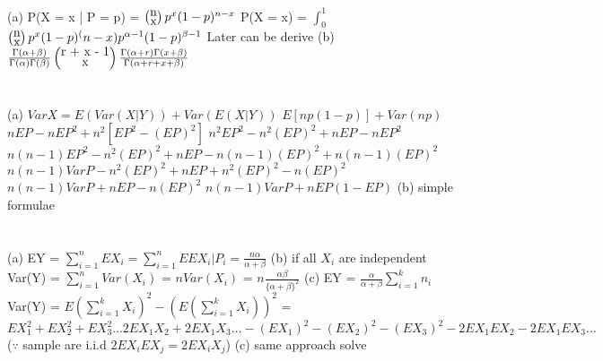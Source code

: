 \documentclass{report}
\begin{document}
\section{}
(a) P(X = x | P = p) = $\left(\stackanchor{n}{x}\right)p^x(1 - p)^{n-x}$
\newline
P(X = x) = $\int_{0}^{1}$$\left(\stackanchor{n}{x}\right)p^x(1-p)^(n-x)p^{\alpha - 1}(1 - p)^{\beta - 1}$
\newline
Later can be derive
\newline
(b) $\frac{\Gamma(\alpha + \beta)}{\Gamma(\alpha)\Gamma(\beta)}\left(\stackanchor{r + x - 1}{x}\right)\frac{\Gamma(\alpha + r)\Gamma(x + \beta)}{\Gamma(\alpha + r + x + \beta)}$
\newline
\section{}
(a) $VarX = E(Var(X|Y)) + Var(E(X|Y))$
\newline
$E[np(1 - p)] + Var(np)$
\newline
$nEP - nEP^2 + n^2[EP^2 - (EP)^2]$
\newline
$n^2EP^2 - n^2(EP)^2 + nEP - nEP^2$
\newline
$n(n-1)EP^2 - n^2(EP)^2 + nEP - n(n-1)(EP)^2 + n(n-1)(EP)^2$
\newline
$n(n-1)VarP - n^2(EP)^2 + nEP + n^2(EP)^2 - n(EP)^2$
\newline
$n(n-1)VarP + nEP - n(EP)^2$
\newline
$n(n-1)VarP + nEP(1 - EP)$
\newline
(b) simple formulae
\section{}
(a) EY = $\sum\limits_{i=1}^{n}EX_i = \sum\limits_{i=1}^{n}EEX_i|P_i = \frac{n\alpha}{\alpha + \beta}$
\newline
(b) if all $X_i$ are independent
\newline
Var(Y) = $\sum\limits_{i=1}^{n}Var(X_i)$
\newline
\quad  = $nVar(X_i)$
\newline
\quad = $n\frac{\alpha\beta}{\{\alpha + \beta\}^2}$
\newline
(c) EY = $\frac{\alpha}{\alpha + \beta}\sum\limits_{i=1}^{k}n_i$
\newline
Var(Y) = $E(\sum\limits_{i=1}^{k}X_i)^2 - (E(\sum\limits_{i=1}^kX_i))^2$
\quad = $EX_1^2 + EX_2^2 + EX_3^2 ... 2EX_1X_2 + 2EX_1X_3 ... - (EX_1)^2 - (EX_2)^2 - (EX_3)^2 - 2EX_1EX_2 - 2EX_1EX_3 ... $
($\because$ sample are i.i.d $2EX_iEX_j = 2EX_iX_j$)
\newline
(c) same approach solve
\end{document}
